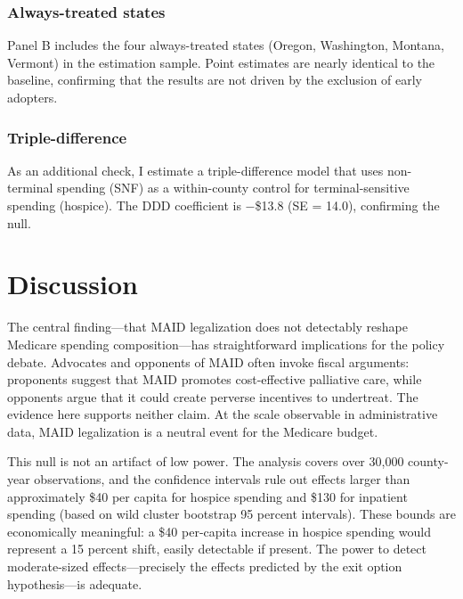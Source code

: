 \documentclass[12pt]{article}
\begin{document}
\subsubsection*{Always-treated states}
Panel B includes the four always-treated states (Oregon, Washington, Montana, Vermont) in the estimation sample. Point estimates are nearly identical to the baseline, confirming that the results are not driven by the exclusion of early adopters.

\subsubsection*{Triple-difference}
As an additional check, I estimate a triple-difference model that uses non-terminal spending (SNF) as a within-county control for terminal-sensitive spending (hospice). The DDD coefficient is $-$\$13.8 (SE = 14.0), confirming the null.


\section{Discussion}
\label{sec:discussion}

The central finding---that MAID legalization does not detectably reshape Medicare spending composition---has straightforward implications for the policy debate. Advocates and opponents of MAID often invoke fiscal arguments: proponents suggest that MAID promotes cost-effective palliative care, while opponents argue that it could create perverse incentives to undertreat. The evidence here supports neither claim. At the scale observable in administrative data, MAID legalization is a neutral event for the Medicare budget.

This null is not an artifact of low power. The analysis covers over 30,000 county-year observations, and the confidence intervals rule out effects larger than approximately \$40 per capita for hospice spending and \$130 for inpatient spending (based on wild cluster bootstrap 95 percent intervals). These bounds are economically meaningful: a \$40 per-capita increase in hospice spending would represent a 15 percent shift, easily detectable if present. The power to detect moderate-sized effects---precisely the effects predicted by the exit option hypothesis---is adequate.
\end{document}
